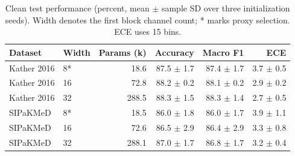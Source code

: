 \begin{table}[t]
\centering
\caption{Clean test performance (percent, mean $\pm$ sample SD over three initialization seeds). Width denotes the first block channel count; * marks proxy selection. ECE uses 15 bins.}
\label{tab:classification}
\small
\setlength{\tabcolsep}{4pt}
\begin{tabular}{llrrrr}
\toprule
Dataset & Width & Params (k) & Accuracy & Macro F1 & ECE \\
\midrule
Kather 2016 & 8* & 18.6 & 87.5 $\pm$ 1.7 & 87.4 $\pm$ 1.7 & 3.7 $\pm$ 0.5 \\
Kather 2016 & 16 & 72.8 & 88.2 $\pm$ 0.2 & 88.1 $\pm$ 0.2 & 2.9 $\pm$ 0.2 \\
Kather 2016 & 32 & 288.5 & 88.3 $\pm$ 1.5 & 88.3 $\pm$ 1.4 & 2.7 $\pm$ 0.5 \\
SIPaKMeD & 8* & 18.5 & 86.0 $\pm$ 1.8 & 86.0 $\pm$ 1.7 & 3.9 $\pm$ 1.1 \\
SIPaKMeD & 16 & 72.6 & 86.5 $\pm$ 2.9 & 86.4 $\pm$ 2.9 & 3.3 $\pm$ 0.8 \\
SIPaKMeD & 32 & 288.1 & 87.0 $\pm$ 1.7 & 86.8 $\pm$ 1.7 & 3.2 $\pm$ 0.4 \\
\bottomrule
\end{tabular}
\end{table}
